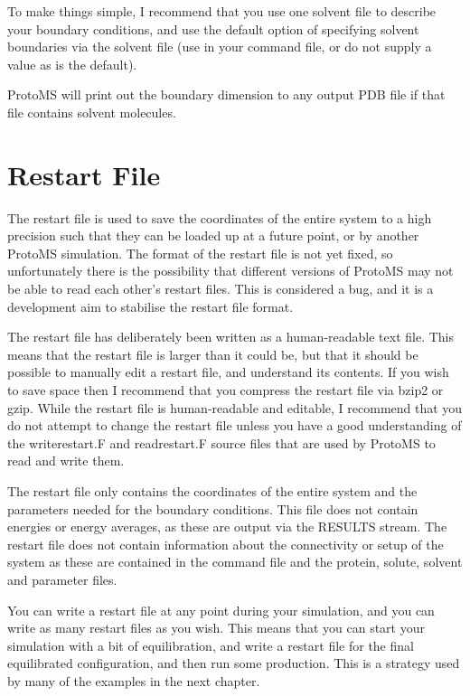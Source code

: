 \documentclass[letterpaper,10pt,english]{sphinxmanual}
\begin{document}
To make things simple, I recommend that you use one solvent file to describe your boundary conditions, and use the default option of specifying solvent boundaries via the solvent file (use  in your command file, or do not supply a  value as  is the default).

ProtoMS will print out the boundary dimension to any output PDB file if that file contains solvent molecules.


\section{Restart File}
\label{protoms:restart-file}
The restart file is used to save the coordinates of the entire system to a high precision such that they can be loaded up at a future point, or by another ProtoMS simulation. The format of the restart file is not yet fixed, so unfortunately there is the possibility that different versions of ProtoMS may not be able to read each other’s restart files. This is considered a bug, and it is a development aim to stabilise the restart file format.

The restart file has deliberately been written as a human-readable text file. This means that the restart file is larger than it could be, but that it should be possible to manually edit a restart file, and understand its contents. If you wish to save space then I recommend that you compress the restart file via bzip2 or gzip. While the
restart file is human-readable and editable, I recommend that you do not attempt to change the restart file unless you have a good understanding of the writerestart.F and readrestart.F source files that are used by ProtoMS to read and write them.

The restart file only contains the coordinates of the entire system and the parameters needed for the boundary conditions. This file does not contain energies or energy averages, as these are output via the RESULTS stream. The restart file does not contain information about the connectivity or setup of the system as these are contained in the command file and the protein, solute, solvent and parameter files.

You can write a restart file at any point during your simulation, and you can write as many restart files as you wish. This means that you can start your simulation with a bit of equilibration, and write a restart file for the final equilibrated configuration, and then run some production. This is a strategy used by many of the examples in the next chapter.
\end{document}
